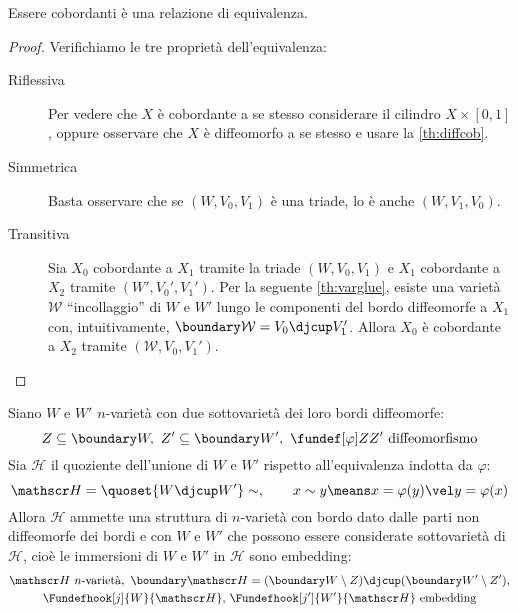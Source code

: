 \begin{lemma}
	Essere cobordanti è una relazione di equivalenza.
\end{lemma}

\begin{proof}
	Verifichiamo le tre proprietà dell'equivalenza:
	\begin{description}
		\item[Riflessiva]
			Per vedere che $X$ è cobordante a se stesso considerare il cilindro $X\times[0,1]$, oppure osservare che $X$ è diffeomorfo a se stesso e usare la \autoref{th:diffcob}.
		\item[Simmetrica]
			Basta osservare che se $(W,V_0,V_1)$ è una triade, lo è anche $(W,V_1,V_0)$.
		\item[Transitiva]
			Sia $X_0$ cobordante a $X_1$ tramite la triade $(W,V_0,V_1)$ e $X_1$ cobordante a $X_2$ tramite $(W',V_0',V_1')$. 
			Per la seguente \autoref{th:varglue}, esiste una varietà $\mathcal W$ ``incollaggio'' di $W$ e $W'$ lungo le componenti del bordo diffeomorfe a $X_1$ con, intuitivamente, $\boundary\mathcal W=V_0\djcup V_1'$.
			Allora $X_0$ è cobordante a $X_2$ tramite $(\mathcal W,V_0,V_1')$.
			\qedhere
	\end{description}
\end{proof}

\begin{prop}[Incollaggio]
	\label{th:varglue}
	Siano $W$ e $W'$ $n$-varietà con due sottovarietà dei loro bordi diffeomorfe:
	\[Z\subseteq\boundary W,\ Z'\subseteq\boundary W',\ \fundef[\varphi]Z{Z'}\text{ diffeomorfismo}\]
	Sia $\mathscr H$ il quoziente dell'unione di $W$ e $W'$ rispetto all'equivalenza indotta da $\varphi$:
	\[\mathscr H=\quoset{W\djcup W'}\sim,\qquad x\sim y\means x=\varphi(y)\vel y=\varphi(x)\]
	Allora $\mathscr H$ ammette una struttura di $n$-varietà con bordo dato dalle parti non diffeomorfe dei bordi e con $W$ e $W'$ che possono essere considerate sottovarietà di $\mathscr H$, cioè le immersioni di $W$ e $W'$ in $\mathscr H$ sono embedding:
	\begin{gather*}
		\mathscr H\text{ $n$-varietà},\ \boundary\mathscr H=(\boundary W\setminus Z)\djcup(\boundary W'\setminus Z'),\\
		\Fundefhook[j]{W}{\mathscr H},\,\Fundefhook[j']{W'}{\mathscr H}\text{ embedding}
	\end{gather*}
\end{prop}

